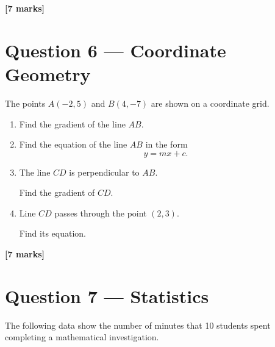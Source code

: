 	\vfill
	
	\noindent
	\textbf{[7 marks]}
	
	\newpage
	
	
	\section*{Question 6 --- Coordinate Geometry}
	
	The points \(A(-2,5)\) and \(B(4,-7)\) are shown on a coordinate grid.
	
	\begin{enumerate}
		\item[(a)] Find the gradient of the line \(AB\).
		
		\vspace{15mm}
		
		\item[(b)] Find the equation of the line \(AB\) in the form
		\[
		y=mx+c.
		\]
		
		\vspace{15mm}
		
		\item[(c)] The line \(CD\) is perpendicular to \(AB\).
		
		Find the gradient of \(CD\).
		
		\vspace{15mm}
		
		\item[(d)] Line \(CD\) passes through the point \((2,3)\).
		
		Find its equation.
	\end{enumerate}
	
	\vfill
	
	\noindent
	\textbf{[7 marks]}
	
	\newpage
	
	
	\section*{Question 7 --- Statistics}
	
	The following data show the number of minutes that 10 students spent
	completing a mathematical investigation.
	
